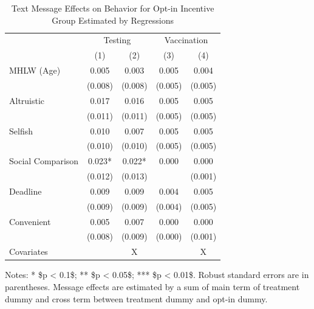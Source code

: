 \documentclass[
]{article}
\begin{document}
\begin{table}

\caption{\label{tab:lh-act}Text Message Effects on Behavior for Opt-in Incentive Group Estimated by Regressions}
\centering
\fontsize{9}{11}\selectfont
\begin{threeparttable}
\begin{tabular}[t]{lcccc}
\toprule
\multicolumn{1}{c}{ } & \multicolumn{2}{c}{Testing} & \multicolumn{2}{c}{Vaccination} \\
\cmidrule(l{3pt}r{3pt}){2-3} \cmidrule(l{3pt}r{3pt}){4-5}
  & (1) & (2) & (3) & (4)\\
\midrule
MHLW (Age) & \num{0.005} & \num{0.003} & \num{0.005} & \num{0.004}\\
 & (\num{0.008}) & (\num{0.008}) & (\num{0.005}) & (\num{0.005})\\
Altruistic & \num{0.017} & \num{0.016} & \num{0.005} & \num{0.005}\\
 & (\num{0.011}) & (\num{0.011}) & (\num{0.005}) & (\num{0.005})\\
Selfish & \num{0.010} & \num{0.007} & \num{0.005} & \num{0.005}\\
 & (\num{0.010}) & (\num{0.010}) & (\num{0.005}) & (\num{0.005})\\
Social Comparison & \num{0.023}* & \num{0.022}* & \num{0.000} & \num{0.000}\\
 & (\num{0.012}) & (\num{0.013}) &  & (\num{0.001})\\
Deadline & \num{0.009} & \num{0.009} & \num{0.004} & \num{0.005}\\
 & (\num{0.009}) & (\num{0.009}) & (\num{0.004}) & (\num{0.005})\\
Convenient & \num{0.005} & \num{0.007} & \num{0.000} & \num{0.000}\\
 & (\num{0.008}) & (\num{0.009}) & (\num{0.000}) & (\num{0.001})\\
Covariates &  & X &  & X\\
\bottomrule
\end{tabular}
\begin{tablenotes}
\item  Notes: * \$p < 0.1\$; ** \$p < 0.05\$; *** \$p < 0.01\$. Robust standard errors are in parentheses. Message effects are estimated by a sum of main term of treatment dummy and cross term between treatment dummy and opt-in dummy.
\end{tablenotes}
\end{threeparttable}
\end{table}
\end{document}
